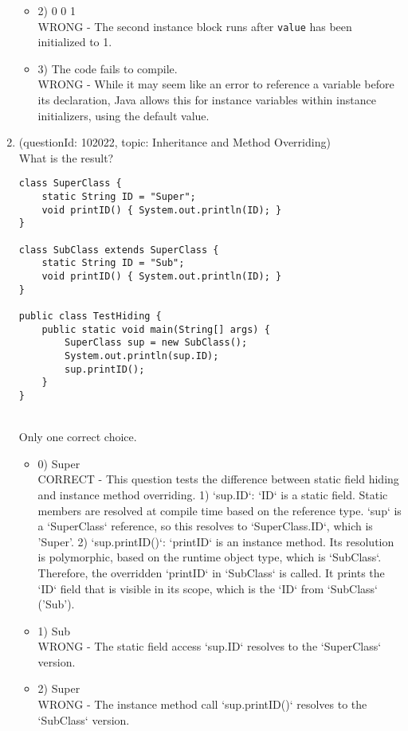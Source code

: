 \documentclass[12pt]{article}
\begin{document}
\begin{enumerate}[label=(\arabic*)]
\begin{itemize}
\item 2) 0 0 1
 \\ 
WRONG - The second instance block runs after \verb|value| has been initialized to 1.

\item 3) The code fails to compile.
 \\ 
WRONG - While it may seem like an error to reference a variable before its declaration, Java allows this for instance variables within instance initializers, using the default value.

\end{itemize}
\item (questionId: 102022, topic: Inheritance and Method Overriding) \\ 
What is the result?
\begin{verbatim}
class SuperClass {
    static String ID = "Super";
    void printID() { System.out.println(ID); }
}

class SubClass extends SuperClass {
    static String ID = "Sub";
    void printID() { System.out.println(ID); }
}

public class TestHiding {
    public static void main(String[] args) {
        SuperClass sup = new SubClass();
        System.out.println(sup.ID);
        sup.printID();
    }
}
\end{verbatim}
\\ \noindent Only one correct choice. 
\begin{itemize}
\item 0) Super\nSub
 \\ 
CORRECT - This question tests the difference between static field hiding and instance method overriding. 1) `sup.ID`: `ID` is a static field. Static members are resolved at compile time based on the reference type. `sup` is a `SuperClass` reference, so this resolves to `SuperClass.ID`, which is 'Super'. 2) `sup.printID()`: `printID` is an instance method. Its resolution is polymorphic, based on the runtime object type, which is `SubClass`. Therefore, the overridden `printID` in `SubClass` is called. It prints the `ID` field that is visible in its scope, which is the `ID` from `SubClass` ('Sub').

\item 1) Sub\nSub
 \\ 
WRONG - The static field access `sup.ID` resolves to the `SuperClass` version.

\item 2) Super\nSuper
 \\ 
WRONG - The instance method call `sup.printID()` resolves to the `SubClass` version.


\end{itemize}
\end{enumerate}
\end{document}
